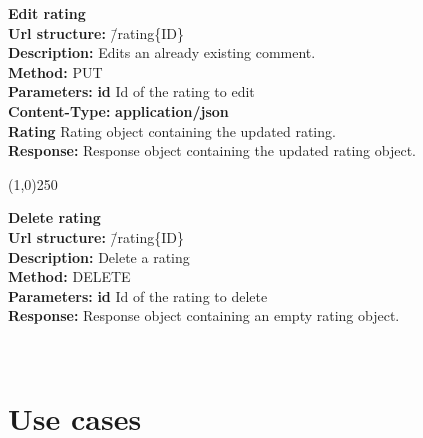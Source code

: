 \documentclass[11pt]{article}
\begin{document}
\begin{tabbing}
\textbf{Edit rating} \\
\textcolor{black!60}{\textbf{Url structure:}} \hspace{0.2in} \= /rating\{ID\} \\
\textcolor{black!60}{\textbf{Description:}}  \> Edits an already existing comment. \\
\textcolor{black!60}{\textbf{Method:}} \> PUT \\
\textcolor{black!60}{\textbf{Parameters:}} \> \textbf{id} Id of the rating to edit \\
\textcolor{black!60}{\textbf{Content-Type:}} \> \textbf{application/json} \\
\> \textbf{Rating} Rating object containing the updated rating. \\
\textcolor{black!60}{\textbf{Response:}} \> Response object containing the updated rating object.
\end{tabbing}

\begin{center}\line(1,0){250}\end{center}

\begin{tabbing}
\textbf{Delete rating} \\
\textcolor{black!60}{\textbf{Url structure:}} \hspace{0.2in} \= /rating\{ID\} \\
\textcolor{black!60}{\textbf{Description:}}  \> Delete a rating \\
\textcolor{black!60}{\textbf{Method:}} \> DELETE \\
\textcolor{black!60}{\textbf{Parameters:}} \> \textbf{id} Id of the rating to delete \\
\textcolor{black!60}{\textbf{Response:}} \> Response object containing an empty rating object.
\end{tabbing}

\newpage
~\\
\newpage

\section{Use cases}
\end{document}
